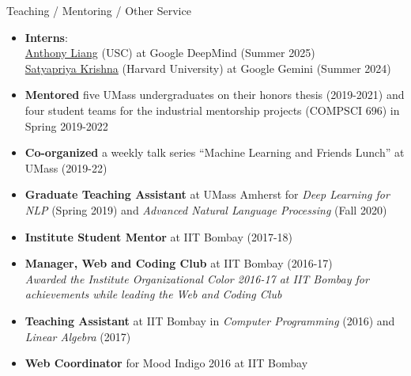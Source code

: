 \documentclass{resume} %
\begin{document}
\vspace*{0.1in}

\begin{rSection}{Teaching / Mentoring / Other Service}
\vspace*{0.1in}
\begin{itemize}[leftmargin=*]
\item \textbf{Interns}:\\
\href{https://aliang8.github.io/}{Anthony Liang} (USC) at Google DeepMind (Summer 2025)\\
\href{https://satyapriyakrishna.com}{Satyapriya Krishna} (Harvard University) at Google Gemini (Summer 2024)
\item \textbf{Mentored} five UMass undergraduates on their honors thesis (2019-2021) and four student teams for the industrial mentorship projects (COMPSCI 696) in Spring 2019-2022
\item \textbf{Co-organized} a weekly talk series ``Machine Learning and Friends Lunch'' at UMass (2019-22)
\item \textbf{Graduate Teaching Assistant} at UMass Amherst for \textit{Deep Learning for NLP} (Spring 2019) and \textit{Advanced Natural Language Processing} (Fall 2020)
\item \textbf{Institute Student Mentor} at IIT Bombay (2017-18)
\item \textbf{Manager, Web and Coding Club} at IIT Bombay (2016-17)\\
\textit{Awarded the Institute Organizational Color 2016-17 at IIT Bombay for achievements while leading the Web and Coding Club}
\item \textbf{Teaching Assistant} at IIT Bombay in \textit{Computer Programming} (2016) and \textit{Linear Algebra} (2017)
\item \textbf{Web Coordinator} for Mood Indigo 2016 at IIT Bombay
\end{itemize}
\end{rSection}

\pagebreak
\end{document}
